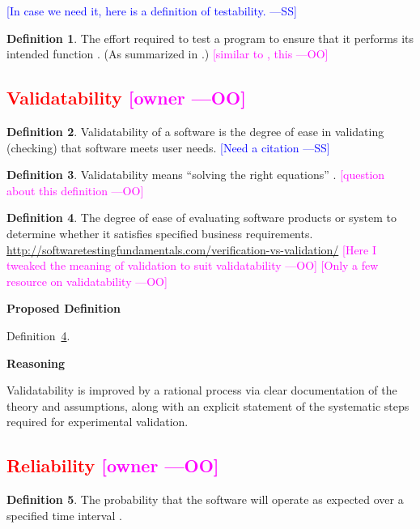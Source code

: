 \documentclass[letterpaper,cleveref]{lipics-v2019}
\newcommand{\authornote}[3]{\textcolor{#1}{[#3 ---#2]}}
\newcommand{\authornote}[3]{}
\newcommand{\wss}[1]{\authornote{blue}{SS}{#1}} %
\newcommand{\oo}[1]{\authornote{magenta}{OO}{#1}} %
\newcommand{\notdone}[1]{\textcolor{red}{#1}}
\theoremstyle{definition}
\newtheorem{defn}{Definition}
\begin{document}
\wss{In case we need it, here is a definition of testability.}

\begin{defn}
	The effort required to test a program to ensure that it performs its
	intended function \citep{McCallEtAl1977}. (As summarized in
	\citet{VanVliet2000}.) \oo{similar to \citep{pressman2005software}, this}
\end{defn}


\subsection{\notdone{Validatability} \oo{owner}}

\begin{defn}
	Validatability of a software is the degree of ease in validating (checking)
	that software meets user needs. \wss{Need a citation}
\end{defn}

\begin{defn}
	Validatability means ``solving the right equations''
	\citep[p.~23]{Roache1998}.
	\oo{question about this definition}
\end{defn}

\begin{defn} \label{DefnValidatability}
	The degree of ease of evaluating software products or system to determine
	whether it satisfies specified business
	requirements.
	\url{http://softwaretestingfundamentals.com/verification-vs-validation/}
	\oo{Here I tweaked the meaning of validation to suit validatability} \oo{Only
		a few resource on validatability}
\end{defn}

\noindent \textbf{Proposed Definition}

Definition~\ref{DefnValidatability}.

\noindent \textbf{Reasoning}

Validatability is improved by a rational process via clear documentation of the
theory and assumptions, along with an explicit statement of the systematic steps
required for experimental validation.

\subsection{\notdone{Reliability} \oo{owner}}

\begin{defn}
	The probability that the software will operate as expected over a specified
	time interval \citep{GhezziEtAl2003}.
\end{defn}
\end{document}
